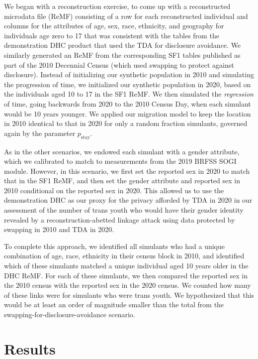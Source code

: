 \documentclass{jpc} %
\theoremstyle{plain}\newtheorem{satz}[thm]{Satz} %
\begin{document}
We began with a reconstruction exercise, to come up with a reconstructed microdata file (ReMF) consisting of a row for each reconstructed individual and columns for the attributes of age, sex, race, ethnicity, and geography for individuals age zero to 17 that was consistent with the tables from the demonstration DHC product that used the TDA for disclosure avoidance.  We similarly generated an ReMF from the corresponding SF1 tables published as part of the 2010 Decennial Census (which used swapping to protect against disclosure).  Instead of initializing our synthetic population in 2010 and simulating the progression of time, we initialized our synthetic population in 2020, based on the individuals aged 10 to 17 in the SF1 ReMF.  We then simulated the \emph{regression} of time, going backwards from 2020 to the 2010 Census Day, when each simulant would be 10 years younger.  We applied our migration model to keep the location in 2010 identical to that in 2020 for only a random fraction simulants, governed again by the parameter $p_{\text{stay}}$.

As in the other scenarios, we endowed each simulant with a gender attribute, which we calibrated to match to measurements from the 2019 BRFSS SOGI module. However, in this scenario, we first set the reported sex in 2020 to match that in the SF1 ReMF, and then set the gender attribute and reported sex in 2010 conditional on the reported sex in 2020.  This allowed us to use the demonstration DHC as our proxy for the privacy afforded by TDA in 2020 in our assessment of the number of trans youth who would have their gender identity revealed by a reconstruction-abetted linkage attack using data protected by swapping in 2010 and TDA in 2020.

To complete this approach, we identified all simulants who had a unique combination of age, race, ethnicity in their census block in 2010, and identified which of these simulants matched a unique individual aged 10 years older in the DHC ReMF.  For each of these simulants, we then compared the reported sex in the 2010 census with the reported sex in the 2020 census. We counted how many of these links were for simulants who were trans youth.  We hypothesized that this would be at least an order of magnitude smaller than the total from the swapping-for-disclosure-avoidance scenario.

\section*{Results}
\end{document}
